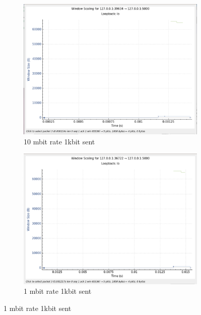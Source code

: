 \documentclass{report}
\begin{document}
\begin{figure}[H]
    \centering
    \begin{subfigure}[b]{0.45\textwidth}
        \centering
        \includegraphics[width=\textwidth]{Pics/Cubic/r10mbit_s1000_ws}
        \caption{10 mbit rate 1kbit sent}
    \end{subfigure}
    \hfill
    \begin{subfigure}[b]{0.45\textwidth}
        \centering
        \includegraphics[width=\textwidth]{Pics/Cubic/r1mbit_s1000_ws}
        \caption{1 mbit rate 1kbit sent}
    \end{subfigure}
    \medskip


\end{figure}
\end{document}
